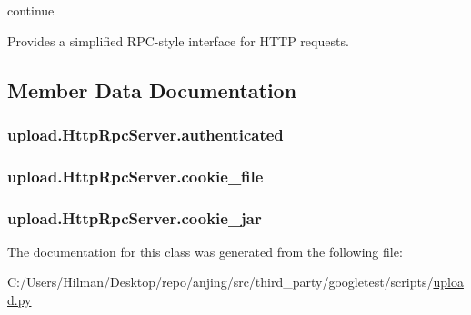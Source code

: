 continue \begin{DoxyVerb}Provides a simplified RPC-style interface for HTTP requests.\end{DoxyVerb}
 

\subsection{Member Data Documentation}
\hypertarget{classupload_1_1_http_rpc_server_aaa356e2491537dd0d4bfc5b1bb0fec96}{}
\subsubsection[{authenticated}]{\setlength{\rightskip}{0pt plus 5cm}upload.\+Http\+Rpc\+Server.\+authenticated}\label{classupload_1_1_http_rpc_server_aaa356e2491537dd0d4bfc5b1bb0fec96}
\hypertarget{classupload_1_1_http_rpc_server_ad5c1a730c030f9d3b5f70c2e0d8b9a1d}{}
\subsubsection[{cookie\+\_\+file}]{\setlength{\rightskip}{0pt plus 5cm}upload.\+Http\+Rpc\+Server.\+cookie\+\_\+file}\label{classupload_1_1_http_rpc_server_ad5c1a730c030f9d3b5f70c2e0d8b9a1d}
\hypertarget{classupload_1_1_http_rpc_server_a1b9c9af7f0a46afd84a9d524782323bf}{}
\subsubsection[{cookie\+\_\+jar}]{\setlength{\rightskip}{0pt plus 5cm}upload.\+Http\+Rpc\+Server.\+cookie\+\_\+jar}\label{classupload_1_1_http_rpc_server_a1b9c9af7f0a46afd84a9d524782323bf}


The documentation for this class was generated from the following file\+:\begin{DoxyCompactItemize}
\item 
C\+:/\+Users/\+Hilman/\+Desktop/repo/anjing/src/third\+\_\+party/googletest/scripts/\hyperlink{upload_8py}{upload.\+py}\end{DoxyCompactItemize}
